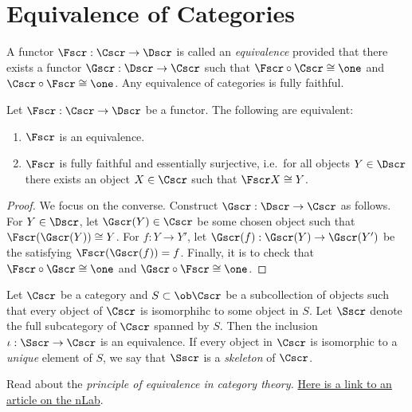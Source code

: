 \section{Equivalence of Categories}

A functor $\Fscr : \Cscr \to \Dscr$ is called an \emph{equivalence} provided that there exists a functor $\Gscr : \Dscr \to \Cscr$ such that $\Fscr \circ \Cscr \cong \one$ and $\Cscr \circ \Fscr \cong \one$.
Any equivalence of categories is fully faithful.


\begin{theorem}
  Let $\Fscr : \Cscr \to \Dscr$ be a functor.
  The following are equivalent:
  \begin{enumerate}
    \item $\Fscr$ is an equivalence.
    \item $\Fscr$ is fully faithful and essentially surjective, i.e.~for all objects $Y \in \Dscr$ there exists an object $X \in \Cscr$ such that $\Fscr X \cong Y$.
  \end{enumerate}
\end{theorem}
\begin{proof}
  We focus on the converse.
  Construct $\Gscr : \Dscr \to \Cscr$ as follows.
  For $Y \in \Dscr$, let $\Gscr(Y) \in \Cscr$ be some chosen object such that $\Fscr(\Gscr(Y)) \cong Y$.
  For $f : Y \to Y'$, let $\Gscr(f) : \Gscr(Y) \to \Gscr(Y')$ be the  satisfying $\Fscr(\Gscr(f)) = f$.
  Finally, it is  to check that $\Fscr \circ \Gscr \cong \one$ and $\Gscr \circ \Fscr \cong \one$.
\end{proof}

\begin{example}
  Let $\Cscr$ be a category and $S \subset \ob \Cscr$ be a subcollection of objects such that every object of $\Cscr$ is isomorphihc to some object in $S$.
  Let $\Sscr$ denote the full subcategory of $\Cscr$ spanned by $S$.
  Then the inclusion $\iota : \Sscr \to \Cscr$ is an equivalence.
  If every object in $\Cscr$ is isomorphic to a \emph{unique} element of $S$, we say that $\Sscr$ is a \emph{skeleton} of $\Cscr$.
\end{example}

\begin{exercise}
  Read about the \emph{principle of equivalence in category theory.}
  \href{https://ncatlab.org/nlab/show/principle+of+equivalence}{Here is a link to an article on the nLab}.
\end{exercise}

